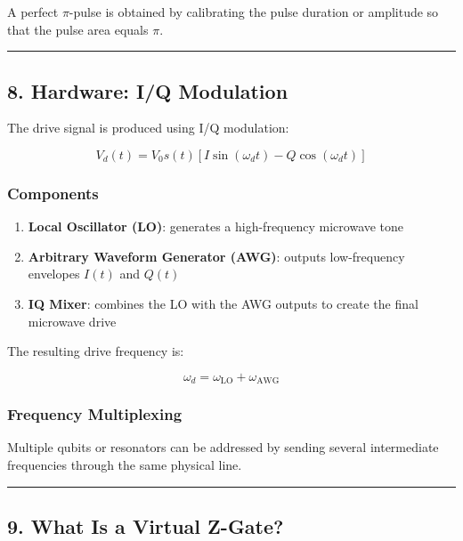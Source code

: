 \documentclass[
]{article}
\providecommand{\tightlist}{%
  \setlength{\itemsep}{0pt}\setlength{\parskip}{0pt}}
\begin{document}
A perfect \(\pi\)-pulse is obtained by calibrating the pulse duration or
amplitude so that the pulse area equals \(\pi\).

\begin{center}\rule{0.5\linewidth}{0.5pt}\end{center}

\subsection{8. Hardware: I/Q Modulation}\label{hardware-iq-modulation}

The drive signal is produced using I/Q modulation:

\[
V_d(t) = V_0 s(t)\left[I\sin(\omega_d t) - Q\cos(\omega_d t)\right]
\]

\subsubsection{Components}\label{components}

\begin{enumerate}
\def\labelenumi{\arabic{enumi}.}
\tightlist
\item
  \textbf{Local Oscillator (LO)}: generates a high-frequency microwave
  tone
\item
  \textbf{Arbitrary Waveform Generator (AWG)}: outputs low-frequency
  envelopes \(I(t)\) and \(Q(t)\)
\item
  \textbf{IQ Mixer}: combines the LO with the AWG outputs to create the
  final microwave drive
\end{enumerate}

The resulting drive frequency is:

\[
\omega_d = \omega_{\text{LO}} + \omega_{\text{AWG}}
\]

\subsubsection{Frequency Multiplexing}\label{frequency-multiplexing}

Multiple qubits or resonators can be addressed by sending several
intermediate frequencies through the same physical line.

\begin{center}\rule{0.5\linewidth}{0.5pt}\end{center}

\subsection{9. What Is a Virtual
Z-Gate?}\label{what-is-a-virtual-z-gate}
\end{document}
